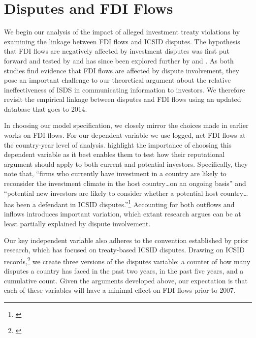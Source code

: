 \documentclass[12pt,onesided]{amsart}
\begin{document}
\section*{Disputes and FDI Flows}

We begin our analysis of the impact of alleged investment treaty violations by examining the linkage between FDI flows and ICSID disputes. The hypothesis that FDI flows are negatively affected by investment disputes was first put forward and tested by \citet{allee:peinhardt:2011} and has since been explored further by \citet{berger2011more} and \citet{aisbettbilateral}. As both studies find evidence that FDI flows are affected by dispute involvement, they pose an important challenge to our theoretical argument about the relative ineffectiveness of ISDS in communicating information to investors. We therefore revisit the empirical linkage between disputes and FDI flows using an updated database that goes to 2014.


In choosing our model specification, we closely mirror the choices made in earlier works on FDI flows. For our dependent variable we use logged, net FDI flows at the country-year level of analysis. \citeauthor{allee:peinhardt:2011} highlight the importance of choosing this dependent variable as it best enables them to test how their reputational argument should apply to both current and potential investors. Specifically, they note that, ``firms who currently have investment in a country are likely to reconsider the investment climate in the host country\ldots on an ongoing basis'' and ``potential new investors are likely to consider whether a potential host country\ldots has been a defendant in ICSID disputes.''\footnote{\citet[p. 419--420]{allee:peinhardt:2011}} Accounting for both outflows and inflows introduces important variation, which extant research argues can be at least partially explained by dispute involvement. 

\nocite{icsid:2014}
Our key independent variable also adheres to the convention established by prior research, which has focused on treaty-based ICSID disputes. Drawing on ICSID records,\footnote{\citet[p. 7, 10]{icsid:2015}} we create three versions of the disputes variable: a counter of how many disputes a country has faced in the past two years, in the past five years, and a cumulative count. Given the arguments developed above, our expectation is that each of these variables will have a minimal effect on FDI flows prior to 2007.
\end{document}
